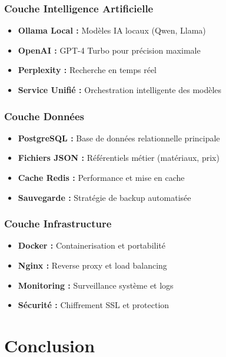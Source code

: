 \subsubsection{Couche Intelligence Artificielle}
\begin{itemize}
    \item \textbf{Ollama Local :} Modèles IA locaux (Qwen, Llama)
    \item \textbf{OpenAI :} GPT-4 Turbo pour précision maximale
    \item \textbf{Perplexity :} Recherche en temps réel
    \item \textbf{Service Unifié :} Orchestration intelligente des modèles
\end{itemize}

\subsubsection{Couche Données}
\begin{itemize}
    \item \textbf{PostgreSQL :} Base de données relationnelle principale
    \item \textbf{Fichiers JSON :} Référentiels métier (matériaux, prix)
    \item \textbf{Cache Redis :} Performance et mise en cache
    \item \textbf{Sauvegarde :} Stratégie de backup automatisée
\end{itemize}

\subsubsection{Couche Infrastructure}
\begin{itemize}
    \item \textbf{Docker :} Containerisation et portabilité
    \item \textbf{Nginx :} Reverse proxy et load balancing
    \item \textbf{Monitoring :} Surveillance système et logs
    \item \textbf{Sécurité :} Chiffrement SSL et protection
\end{itemize}


\section{Conclusion}

